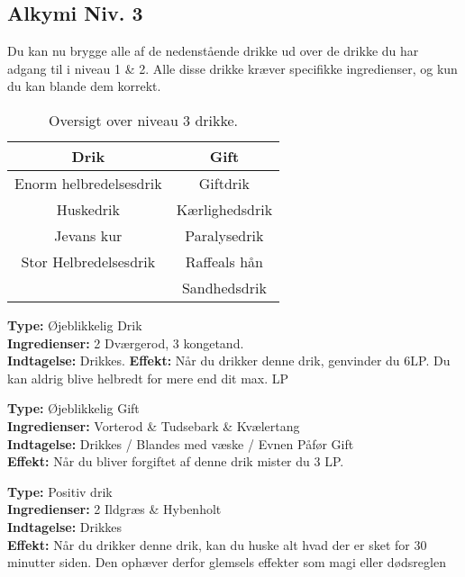\subsection{Alkymi Niv. 3}
Du kan nu brygge alle af de nedenstående drikke ud over de drikke du har adgang til i niveau 1 \& 2. Alle disse drikke kræver specifikke ingredienser, og kun du kan blande dem korrekt.\\

\begin{table}[H]
    \centering
    \begin{tabular}{|c|c|}
        \rowcolor{cerulean!80}\hline
        Drik & Gift \\\hline
        Enorm helbredelsesdrik & Giftdrik \\\hline
        Huskedrik &  Kærlighedsdrik \\\hline
        Jevans kur &  Paralysedrik \\\hline
        Stor Helbredelsesdrik & Raffeals hån  \\\hline
         & Sandhedsdrik  \\\hline
    \end{tabular}
    \caption{Oversigt over niveau 3 drikke.}
\end{table}

\begin{drik*}
\textbf{Type:} Øjeblikkelig Drik\\
\textbf{Ingredienser:} 2 Dværgerod, 3 kongetand.\\
\textbf{Indtagelse:} Drikkes.
\textbf{Effekt:} Når du drikker denne drik, genvinder du 6LP. Du kan aldrig blive helbredt for mere end dit max. LP
\end{drik*}

\begin{gift*}[Giftdrik]
\textbf{Type:} Øjeblikkelig Gift \\
\textbf{Ingredienser:} Vorterod \& Tudsebark \& Kvælertang\\
\textbf{Indtagelse:} Drikkes / Blandes med væske / Evnen Påfør Gift\\
\textbf{Effekt:} Når du bliver forgiftet af denne drik mister du 3 LP.\\
\end{gift*}

\begin{drik*}[Huskedrik]
\textbf{Type:} Positiv drik\\
\textbf{Ingredienser:} 2 Ildgræs \& Hybenholt\\
\textbf{Indtagelse:} Drikkes\\
\textbf{Effekt:} Når du drikker denne drik, kan du huske alt hvad der er sket for 30 minutter siden. Den ophæver derfor glemsels effekter som magi eller dødsreglen\\
\end{drik*}

